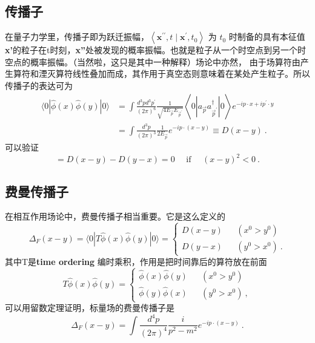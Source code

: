 \subsection{传播子}
在量子力学里，传播子即为跃迁振幅，$\left\langle\mathbf{x}^{\prime \prime}, t \mid \mathbf{x}^{\prime}, t_{0}\right\rangle$ 为 $t_0$ 时制备的具有本征值\textbf{x'}的粒子在t时刻，\textbf{x''}处被发现的概率振幅。也就是粒子从一个时空点到另一个时空点的概率振幅。（当然啦，这只是其中一种解释）场论中亦然，
由于场算符由产生算符和湮灭算符线性叠加而成，其作用于真空态则意味着在某处产生粒子。所以传播子的表达可为
$$\begin{aligned}\langle 0|\hat{\phi}(x) \hat{\phi}(y)| 0\rangle &=\int \frac{d^{3} p d^{3} p^{\prime}}{(2 \pi)^{6}} \frac{1}{\sqrt{4 E_{\vec{p}} E_{\vec{p}^{\prime}}}}\left\langle 0\left|a_{\vec{p}} a_{\vec{p}^{\prime}}^{\dagger}\right| 0\right\rangle e^{-i p \cdot x+i p^{\prime} \cdot y} \\ &=\int \frac{d^{3} p}{(2 \pi)^{3}} \frac{1}{2 E_{\vec{p}}} e^{-i p \cdot(x-y)} \equiv D(x-y) ~.\end{aligned}$$
可以验证
\begin{equation}
[\hat{\phi}(x), \hat{\phi}(y)]=D(x-y)-D(y-x)=0 \quad \text { if } \quad(x-y)^{2}<0~.
\end{equation}

\subsection{费曼传播子}
在相互作用场论中，费曼传播子相当重要。它是这么定义的
\begin{equation}
\Delta_{F}(x-y)=\langle 0|T \hat{\phi}(x) \hat{\phi}(y)| 0\rangle=\left\{\begin{array}{ll}
D(x-y) && (x^{0}>y^{0}) \\
D(y-x) && (y^{0}>x^{0})~.
\end{array}\right.
\end{equation}
其中T是\textbf{time ordering} 编时乘积，作用是把时间靠后的算符放在前面
\begin{equation}
T \hat{\phi}(x) \hat{\phi}(y)=\left\{\begin{array}{ll}
\hat{\phi}(x) \hat{\phi}(y) && (x^{0}>y^{0}) \\
\hat{\phi}(y) \hat{\phi}(x) && (y^{0}>x^{0})~,
\end{array}\right.
\end{equation}
可以用留数定理证明，标量场的费曼传播子是
\begin{equation}
\Delta_{F}(x-y)=\int \frac{d^{4} p}{(2 \pi)^{4}} \frac{i}{p^{2}-m^{2}} e^{-i p \cdot(x-y)}~.
\end{equation}


